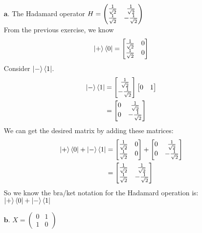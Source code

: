 \documentclass[11pt]{article}
\def\srtt{\ensuremath\frac{1}{\sqrt{2}}}
\begin{document}
\begin{enumerate}
    \item[$\textbf{a.}$]
    The Hadamard operator 
        $H = \begin{pmatrix}\srtt & \srtt \\ \srtt & -\srtt \end{pmatrix}$
    \\ 
    From the previous exercise, we know 
        $$\ket{+}\bra{0} = \begin{bmatrix} \srtt & 0 \\ \srtt & 0 \end{bmatrix}$$
    Consider $\ket{-}\bra{1}$. 
    \begin{align*}
        \ket{-}\bra{1} &= \begin{bmatrix}\srtt \\ -\srtt\end{bmatrix}
            \begin{bmatrix}0 & 1\end{bmatrix} \\
            &= \begin{bmatrix}
                0 & \srtt \\
                0 & -\srtt
            \end{bmatrix}
    \end{align*}
    We can get the desired matrix by adding these matrices:
        \begin{align*}
        \ket{+}\bra{0} + \ket{-}\bra{1}
            &= \begin{bmatrix} 
                \srtt & 0 \\ 
                \srtt & 0 
                \end{bmatrix}
                + 
                \begin{bmatrix}
                0 & \srtt \\
                0 & -\srtt
                \end{bmatrix} \\
            &= \begin{bmatrix}
                \srtt & \srtt \\
                \srtt & -\srtt
                \end{bmatrix}
        \end{align*}
    So we know the bra/ket notation for the Hadamard operation is: 
        $\ket{+}\bra{0} + \ket{-}\bra{1}$
\newpage
    \item[$\textbf{b.}$]
    $X = \begin{pmatrix}0 & 1 \\ 1 & 0 \end{pmatrix}$ \\

\end{enumerate}
\end{document}
